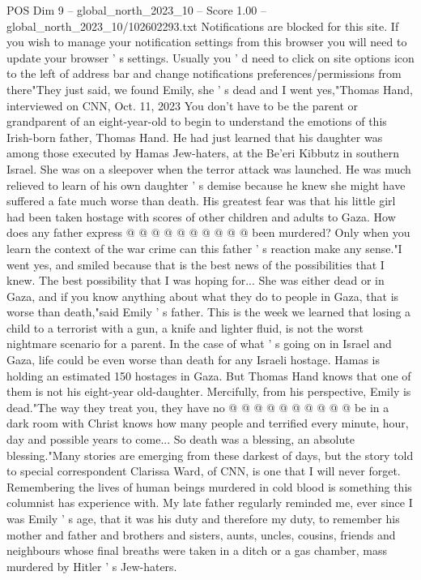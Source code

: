 \begin{textsample}{POS Dim 9 – global\_north\_2023\_10 – Score 1.00 – global\_north\_2023\_10/102602293.txt}  \label{ex:f9_pos_308}
Notifications are blocked for this site.
If you wish to manage your notification settings from this browser you will need to update your browser ' s settings.
Usually you ' d need to click on site options icon to the left of address bar and change notifications preferences/permissions from there"They just said, we found Emily, she ' s dead and I went yes,"Thomas Hand, interviewed on CNN, Oct. 11, 2023 You don't have to be the parent or grandparent of an eight-year-old to begin to understand the emotions of this Irish-born father, Thomas Hand.
He had just learned that his daughter was among those executed by Hamas Jew-haters, at the Be'eri Kibbutz in southern Israel.
She was on a sleepover when the terror attack was launched.
He was much relieved to learn of his own daughter ' s demise because he knew she might have suffered a fate much worse than death.
His greatest fear was that his little girl had been taken hostage with scores of other children and adults to Gaza.
How does any father express @ @ @ @ @ @ @ @ @ @ been murdered?
Only when you learn the context of the war crime can this father ' s reaction make any sense."I went yes, and smiled because that is the best news of the possibilities that I knew.
The best possibility that I was hoping for...
She was either dead or in Gaza, and if you know anything about what they do to people in Gaza, that is worse than death,"said Emily ' s father.
This is the week we learned that losing a child to a terrorist with a gun, a knife and lighter fluid, is not the worst nightmare scenario for a parent.
In the case of what ' s going on in Israel and Gaza, life could be even worse than death for any Israeli hostage.
Hamas is holding an estimated 150 hostages in Gaza.
But Thomas Hand knows that one of them is not his eight-year old-daughter.
Mercifully, from his perspective, Emily is dead."The way they treat you, they have no @ @ @ @ @ @ @ @ @ @ be in a dark room with Christ knows how many people and terrified every minute, hour, day and possible years to come...
So death was a blessing, an absolute blessing."Many stories are emerging from these darkest of days, but the story told to special correspondent Clarissa Ward, of CNN, is one that I will never forget.
Remembering the lives of human beings murdered in cold blood is something this columnist has experience with.
My late father regularly reminded me, ever since I was Emily ' s age, that it was his duty and therefore my duty, to remember his mother and father and brothers and sisters, aunts, uncles, cousins, friends and neighbours whose final breaths were taken in a ditch or a gas chamber, mass murdered by Hitler ' s Jew-haters.

\end{textsample}
